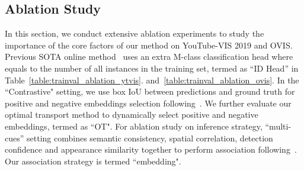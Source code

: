 \documentclass[runningheads]{llncs}
\begin{document}
\setlength{\tabcolsep}{4pt}
\begin{table}[t]
\begin{center}
\caption{Ablation study on contrastive learning and inference strategy on OVIS. Medium and heavy denote the AP and AR of objects moderately occluded, and heavily occluded, respectively.}
\label{table:trainval_ablation_ovis}
\end{center}
\vspace{-2em}
\end{table}
\setlength{\tabcolsep}{1.4pt}



\subsection{Ablation Study}

In this section, we conduct extensive ablation experiments to study the importance of the core factors of our method on YouTube-VIS 2019 and OVIS.
Previous SOTA online method~\cite{CrossVIS} uses an extra M-class classification head where  equals to the number of all instances in the training set, termed as ``ID Head'' in Table~\ref{table:trainval_ablation_ytvis}. and~\ref{table:trainval_ablation_ovis}. 
In the ``Contrastive" setting, we use box IoU between predictions and ground truth for positive and negative embeddings selection following~\cite{QDTrack}. We further evaluate our optimal transport method to dynamically select positive and negative embeddings, termed as ``OT".
For ablation study on inference strategy, ``multi-cues'' setting combines semantic consistency, spatial correlation, detection confidence and appearance similarity together to perform association following~\cite{MaskTrackRCNN,CrossVIS}. Our association strategy is termed ``embedding".
\end{document}
